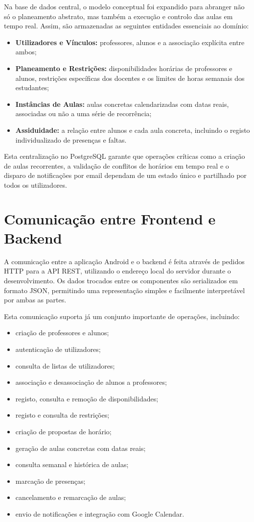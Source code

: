 Na base de dados central, o modelo conceptual foi expandido para abranger não só o planeamento abstrato, mas também a execução e controlo das aulas em tempo real. Assim, são armazenadas as seguintes entidades essenciais ao domínio:

\begin{itemize}
    \item \textbf{Utilizadores e Vínculos:} professores, alunos e a associação explícita entre ambos;
    \item \textbf{Planeamento e Restrições:} disponibilidades horárias de professores e alunos, restrições específicas dos docentes e os limites de horas semanais dos estudantes;
    \item \textbf{Instâncias de Aulas:} aulas concretas calendarizadas com datas reais, associadas ou não a uma série de recorrência;
    \item \textbf{Assiduidade:} a relação entre alunos e cada aula concreta, incluindo o registo individualizado de presenças e faltas.
\end{itemize}

Esta centralização no PostgreSQL garante que operações críticas como a criação de aulas recorrentes, a validação de conflitos de horários em tempo real e o disparo de notificações por email dependam de um estado único e partilhado por todos os utilizadores.

\section{Comunicação entre Frontend e Backend}

A comunicação entre a aplicação Android e o backend é feita através de pedidos HTTP para a API REST, utilizando o endereço local do
servidor durante o desenvolvimento. Os dados trocados entre os componentes são serializados em formato JSON, permitindo uma
representação simples e facilmente interpretável por ambas as partes.

Esta comunicação suporta já um conjunto importante de operações, incluindo:

\begin{itemize}
    \item criação de professores e alunos;
    \item autenticação de utilizadores;
    \item consulta de listas de utilizadores;
    \item associação e desassociação de alunos a professores;
    \item registo, consulta e remoção de disponibilidades;
    \item registo e consulta de restrições;
    \item criação de propostas de horário;
    \item geração de aulas concretas com datas reais;
    \item consulta semanal e histórica de aulas;
    \item marcação de presenças;
    \item cancelamento e remarcação de aulas;
    \item envio de notificações e integração com Google Calendar.
\end{itemize}

